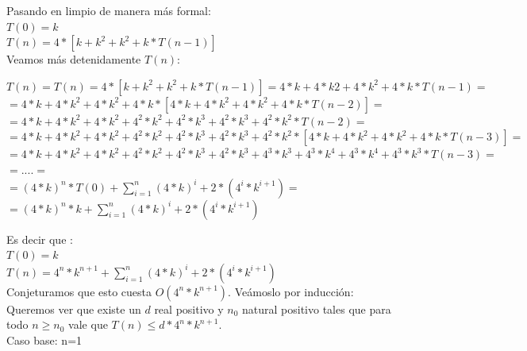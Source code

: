 \indent Pasando en limpio de manera más formal:\\
\indent $T(0)=k$\\
\indent $T(n)=4*[k + k^{2} + k^{2} + k* T(n-1)]$\\

\indent Veamos más detenidamente $T(n)$:\\
\begin{center}
\indent $T(n)= T(n)=4*[k + k^{2} + k^{2} + k* T(n-1)] = 4*k + 4*k{2} + 4*k^{2} + 4*k * T(n-1)=$ \\

\indent $= 4*k + 4*k^{2} + 4*k^{2} + 4*k *[4*k + 4*k^{2} + 4*k^{2} + 4*k * T(n-2)]=$\\

\indent $=4*k + 4*k^{2} + 4*k^{2} + 4^{2}*k^{2} + 4^{2}*k^{3} + 4^{2}*k^{3}+ 4^{2}*k^{2} * T(n-2)=$\\

\indent $=4*k + 4*k^{2} + 4*k^{2} + 4^{2}*k^{2} + 4^{2}*k^{3} + 4^{2}*k^{3}+ 4^{2}*k^{2} * [4*k + 4*k^{2} + 4*k^{2} + 4*k* T(n-3)]=$\\

\indent $=4*k + 4*k^{2} + 4*k^{2} + 4^{2}*k^{2} + 4^{2}*k^{3} + 4^{2}*k^{3}+ 4^{3}*k^{3} + 4^{3}*k^{4} + 4^{3}*k^{4} + 4^{3}*k^{3} * T(n-3)=$\\

\indent $=....=$\\

\indent $=  (4*k)^{n} * T(0) + \sum_{i=1}^{n} (4*k)^{i} + 2 * (4^{i}* k^{i+1})=$ \\

\indent $=  (4*k)^{n} * k + \sum_{i=1}^{n} (4*k)^{i} + 2 * (4^{i}* k^{i+1})$ \\

\end{center}


\indent Es decir que :\\

\indent $T(0)=k$\\
\indent $T(n)= 4^{n}* k^{n+1} + \sum_{i=1}^{n} (4*k)^{i} + 2 * (4^{i}* k^{i+1})$\\

\indent Conjeturamos que esto cuesta $O(4^{n}*k^{n+1})$. Veámoslo por inducción:\\

\indent Queremos ver que existe un $d$ real positivo y $n_{0}$ natural positivo tales que para todo $n\geq n_{0}$ vale que $T(n) \leq d * 4^{n}*k^{n+1}$.\\
\indent Caso base: n=1 \\

